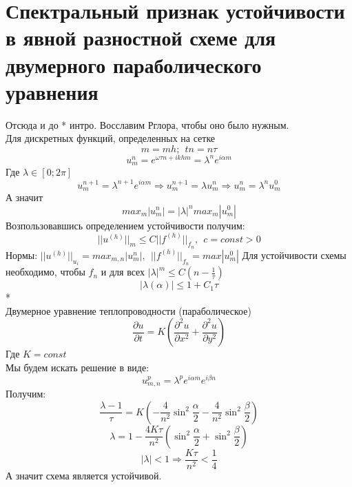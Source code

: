 \documentclass[__main__.tex]{subfiles}
\begin{document}
\section{Спектральный признак устойчивости в явной разностной схеме для двумерного параболического уравнения}

Отсюда и до * интро. Восславим Рглора, чтобы оно было нужным.\\

Для дискретных функций, определенных на сетке
$$
m=mh;\ \ tn=n\tau
$$
$$u^n_m=e^{\omega\tau n+i k h m}=\lambda^n e^{i\alpha m}$$
Где $\lambda\in[0;2\pi]$
$$u^{n+1}_m=\lambda^{n+1} e^{i\alpha m}\Rightarrow u^{n+1}_m=\lambda u^n_m\Rightarrow u^n_m=\lambda^n u^0_m$$
А значит
$$max_m|u^n_m|=|\lambda|^n max_m|u^0_m|$$
Возпользовавшись определением устойчивости получим:
$$||u^{(h)}||_m\le C||f^{(h)}||_{f_n},\ \ c=const>0$$
Нормы: $||u^{(h)}||_{u_i}=max_{m,n}|u^n_m|,\ \ ||f^{(h)}||_{f_n}=max|u^0_m|$
Для устойчивости схемы необходимо, чтобы $f_n$ и для всех $|\lambda|^m\le C(n-\frac{1}{\tau})$
$$|\lambda(\alpha)| \le 1+C_1 \tau$$
*\\
Двумерное уравнение теплопроводности (параболическое)
$$\frac{\partial u}{\partial t}=K\left(\frac{\partial^2 u}{\partial x^2}+\frac{\partial^2 u}{\partial y^2}\right)$$
Где $K=const$\\
Мы будем искать решение в виде:
$$u^p_{m,n}=\lambda^p e^{i\alpha m} e^{i\beta n}$$
Получим:$$\frac{\lambda-1}{\tau}=K(-\frac{4}{n^2}\sin^2{\frac{\alpha}{2}}-\frac{4}{n^2}\sin^2{\frac{\beta}{2}})$$
$$\lambda=1-\frac{4K\tau}{n^2}(\sin^2{\frac{\alpha}{2}}+\sin^2{\frac{\beta}{2}})$$
$$|\lambda|<1\Rightarrow \frac{K\tau}{n^2}<\frac{1}{4}$$
А значит схема является устойчивой.
\end{document}
